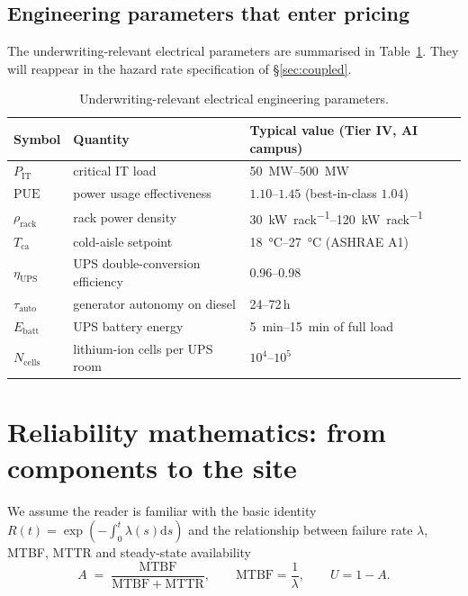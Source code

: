 \documentclass[11pt,a4paper]{article}
\let\origsection\section
\renewcommand{\section}{\clearpage\origsection}
\theoremstyle{ia}
\newcommand{\1}{\mathbf{1}}
\newcommand{\dd}{\mathrm{d}}
\begin{document}
\subsection{Engineering parameters that enter pricing}\label{ss:eng-params}

The underwriting-relevant electrical parameters are summarised in
Table~\ref{tab:eng-params}. They will reappear in the hazard rate
specification of \S\ref{sec:coupled}.

\begin{table}[ht]
\centering\footnotesize
\caption{Underwriting-relevant electrical engineering parameters.}\label{tab:eng-params}
\begin{tabular}{lll}
\toprule
Symbol & Quantity & Typical value (Tier IV, AI campus) \\
\midrule
$P_{\mathrm{IT}}$       & critical IT load                & \SI{50}{\mega\watt}--\SI{500}{\mega\watt} \\
$\mathrm{PUE}$          & power usage effectiveness       & $1.10$--$1.45$ (best-in-class $1.04$) \\
$\rho_{\mathrm{rack}}$  & rack power density              & \SIrange{30}{120}{\kilo\watt\per rack} \\
$T_{\mathrm{ca}}$       & cold-aisle setpoint             & \SIrange{18}{27}{\celsius} (ASHRAE A1) \\
$\eta_{\mathrm{UPS}}$   & UPS double-conversion efficiency & 0.96--0.98 \\
$\tau_{\mathrm{auto}}$  & generator autonomy on diesel    & 24--72\,h \\
$E_{\mathrm{batt}}$     & UPS battery energy              & \SIrange{5}{15}{min} of full load \\
$N_{\mathrm{cells}}$    & lithium-ion cells per UPS room  & $10^4$--$10^5$ \\
\bottomrule
\end{tabular}
\end{table}



\section{Reliability mathematics: from components to the site}\label{sec:reliability}

We assume the reader is familiar with the basic identity
$R(t)=\exp(-\int_0^t \lambda(s)\dd s)$ and the relationship between
failure rate $\lambda$, MTBF, MTTR and steady-state availability
\begin{equation}\label{eq:avail}
   A \;=\; \frac{\mathrm{MTBF}}{\mathrm{MTBF}+\mathrm{MTTR}},
   \qquad \mathrm{MTBF}=\frac{1}{\lambda}, \qquad U=1-A .
\end{equation}
\end{document}
